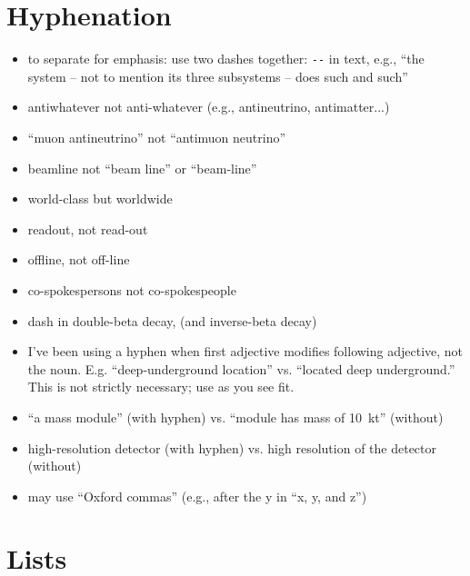 \section{Hyphenation}
\label{sec:hyphen}

\begin{itemize}
\item to separate for emphasis: use two dashes together: \verb|--| in text, e.g.,  ``the system -- not to mention its three subsystems -- does such and such'' 
\item antiwhatever not anti-whatever (e.g., antineutrino, antimatter...)
\item ``muon antineutrino'' not ``antimuon neutrino''
\item beamline not ``beam line'' or ``beam-line'' 
\item world-class but worldwide   
\item readout, not read-out
\item offline, not off-line
\item co-spokespersons not co-spokespeople
\item dash in double-beta decay, (and inverse-beta decay)
\item I've been using a hyphen when first adjective modifies following adjective, not the noun. E.g. ``deep-underground location'' vs. ``located deep underground.''  This is not strictly necessary; use as you see fit.
\item ``a  mass module'' (with hyphen) vs. ``module has mass of \SI{10}{kt}'' (without)
\item high-resolution detector (with hyphen) vs. high resolution of the detector (without)
\item may use ``Oxford commas'' (e.g., after the y in ``x, y, and z'')
\end{itemize}

\section{Lists}
\label{sec:lists}

